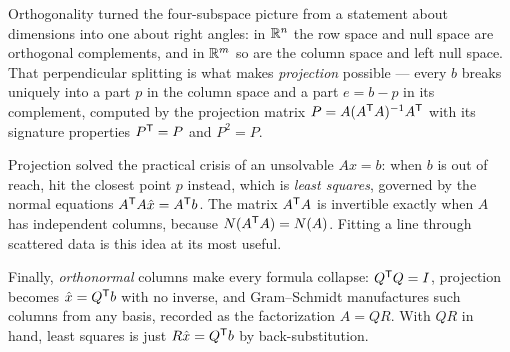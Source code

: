 Orthogonality turned the four-subspace picture from a statement about dimensions into one about right angles: in $\mathbb{R}^n$ the row space and null space are orthogonal complements, and in $\mathbb{R}^m$ so are the column space and left null space. That perpendicular splitting is what makes \emph{projection} possible --- every $b$ breaks uniquely into a part $p$ in the column space and a part $e=b-p$ in its complement, computed by the projection matrix $P=A(A^{\mathsf T} A)^{-1}A^{\mathsf T}$ with its signature properties $P^{\mathsf T}=P$ and $P^2=P$.

Projection solved the practical crisis of an unsolvable $Ax=b$: when $b$ is out of reach, hit the closest point $p$ instead, which is \emph{least squares}, governed by the normal equations $A^{\mathsf T} A\hat x = A^{\mathsf T} b$. The matrix $A^{\mathsf T} A$ is invertible exactly when $A$ has independent columns, because $N(A^{\mathsf T} A)=N(A)$. Fitting a line through scattered data is this idea at its most useful.

Finally, \emph{orthonormal} columns make every formula collapse: $Q^{\mathsf T} Q=I$, projection becomes $\hat x=Q^{\mathsf T} b$ with no inverse, and Gram--Schmidt manufactures such columns from any basis, recorded as the factorization $A=QR$. With $QR$ in hand, least squares is just $R\hat x=Q^{\mathsf T} b$ by back-substitution.

